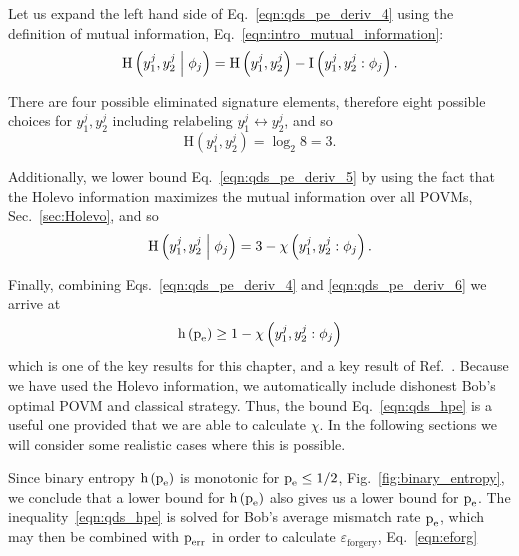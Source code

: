 \noindent Let us expand the left hand side of Eq.~\ref{eqn:qds_pe_deriv_4} using the definition of mutual information, Eq.~\ref{eqn:intro_mutual_information}:
\begin{equation}\label{eqn:qds_pe_deriv_5}
\text{H}\left(y_1^j, y_2^j \; \middle| \; \phi_j\right) = \text{H}\left(y_1^j, y_2^j\right) - \text{I}\left(y_1^j, y_2^j : \phi_j\right).
\end{equation}

\noindent There are four possible eliminated signature elements, therefore eight possible choices for $y_1^j, y_2^j$ including relabeling $y_1^j \leftrightarrow y_2^j$, and so 
\begin{equation}
\text{H}\left(y_1^j, y_2^j\right) = \log_2 8 = 3.
\end{equation}

\noindent Additionally, we lower bound Eq.~\ref{eqn:qds_pe_deriv_5} by using the fact that the Holevo information maximizes the mutual information over all POVMs, Sec.~\ref{sec:Holevo}, and so
\begin{equation}\label{eqn:qds_pe_deriv_6}
\text{H}\left(y_1^j, y_2^j \; \middle| \; \phi_j \right) = 3 - \chi\left(y_1^j, y_2^j : \phi_j\right).
\end{equation}

\noindent Finally, combining Eqs.~\ref{eqn:qds_pe_deriv_4} and \ref{eqn:qds_pe_deriv_6} we arrive at
\begin{equation}\label{eqn:qds_hpe}
\text{h}\left(\text{p}_{\text{e}}\right) \ge 1 - \chi \left(y_1^j, y_2^j : \phi_j\right)
\end{equation}
which is one of the key results for this chapter, and a key result of Ref.~\cite{Thornton2019}. Because we have used the Holevo information, we automatically include dishonest Bob's optimal POVM and classical strategy. Thus, the bound Eq.~\ref{eqn:qds_hpe} is a useful one provided that we are able to calculate $\chi$. In the following sections we will consider some realistic cases where this is possible.

Since binary entropy $\text{h}\left(\text{p}_{\text{e}}\right)$ is monotonic for $\text{p}_{\text{e}} \le 1/2$, Fig.~\ref{fig:binary_entropy}, we conclude that a lower bound for $\text{h}\left(\text{p}_{\text{e}}\right)$ also gives us a lower bound for $\text{p}_{\text{e}}$. The inequality~\ref{eqn:qds_hpe} is solved for Bob's average mismatch rate $\text{p}_{\text{e}}$, which may then be combined with $\text{p}_{\text{err}}$ in order to calculate $\varepsilon_{\text{forgery}}$, Eq.~\ref{eqn:eforg}


